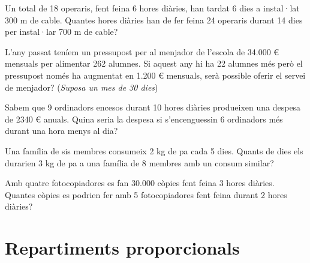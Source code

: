  
 \begin{mylist}
 	

\exer
  Un total de 18 operaris, fent feina 6 hores diàries, han tardat 6 dies
  a instal·lat 300 m de cable. Quantes hores diàries han de fer feina 24
  operaris durant 14 dies per instal·lar 700 m de cable?


\exer
  L'any passat teníem un pressupost per al menjador de l'escola de
  34.000 \euro{} mensuals per alimentar 262 alumnes. Si aquest any hi ha
  22 alumnes més però el pressupost només ha augmentat en 1.200 \euro{}
  mensuals, serà possible oferir el servei de menjador? (\textit{Suposa un mes de 30 dies})

\exer
  Sabem que 9 ordinadors encesos durant 10 hores diàries produeixen una
  despesa de 2340 \euro{} anuals. Quina seria la despesa si
  s'encenguessin 6 ordinadors més durant una hora menys al dia?


\exer
  Una família de sis membres consumeix 2 kg de pa cada 5 dies. Quants de
  dies els durarien 3 kg de pa a una família de 8 membres amb un consum
  similar?


\exer
  Amb quatre fotocopiadores es fan 30.000 còpies fent feina 3 hores
  diàries. Quantes còpies es podrien fer amb 5 fotocopiadores fent feina
  durant 2 hores diàries?


\end{mylist}


\section{Repartiments proporcionals}

